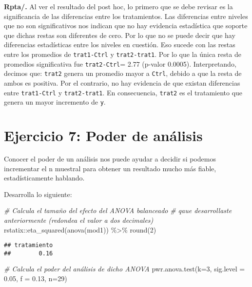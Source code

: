 \documentclass[
]{article}
\newenvironment{Shaded}{}{}
\newcommand{\AttributeTok}[1]{\textcolor[rgb]{0.49,0.56,0.16}{#1}}
\newcommand{\CommentTok}[1]{\textcolor[rgb]{0.38,0.63,0.69}{\textit{#1}}}
\newcommand{\DecValTok}[1]{\textcolor[rgb]{0.25,0.63,0.44}{#1}}
\newcommand{\FloatTok}[1]{\textcolor[rgb]{0.25,0.63,0.44}{#1}}
\newcommand{\FunctionTok}[1]{\textcolor[rgb]{0.02,0.16,0.49}{#1}}
\newcommand{\NormalTok}[1]{#1}
\newcommand{\SpecialCharTok}[1]{\textcolor[rgb]{0.25,0.44,0.63}{#1}}
\begin{document}
\textbf{Rpta/.} Al ver el resultado del post hoc, lo primero que se debe
revisar es la significancia de las diferencias entre los tratamientos.
Las diferencias entre niveles que no son significativos nos indican que
no hay evidencia estadística que soporte que dichas restas son
diferentes de cero. Por lo que no se puede decir que hay diferencias
estadísticas entre los niveles en cuestión. Eso sucede con las restas
entre los promedios de \texttt{trat1-Ctrl} y \texttt{trat2-trat1}. Por
lo que la única resta de promedios significativa fue
\texttt{trat2-Ctrl}= 2.77 (p-valor 0.0005). Interpretando, decimos que:
\texttt{trat2} genera un promedio mayor a \texttt{Ctrl}, debido a que la
resta de ambos es positiva. Por el contrario, no hay evidencia de que
existan diferencias entre \texttt{trat1-Ctrl} y \texttt{trat2-trat1}. En
consecuencia, \texttt{trat2} es el tratamiento que genera un mayor
incremento de \texttt{y}.

\hypertarget{ejercicio-7-poder-de-anuxe1lisis}{%
\section{\texorpdfstring{\textbf{Ejercicio 7: Poder de
análisis}}{Ejercicio 7: Poder de análisis}}\label{ejercicio-7-poder-de-anuxe1lisis}}

Conocer el poder de un análisis nos puede ayudar a decidir si podemos
incrementar el n muestral para obtener un resultado mucho más fiable,
estadísticamente hablando.

Desarrolla lo siguiente:

\begin{Shaded}
\begin{Highlighting}[]
\CommentTok{\# Calcula el tamaño del efecto del ANOVA balanceado}
\CommentTok{\# qaue desarrollaste anteriormente (redondea el valor a dos decimales)}
\NormalTok{rstatix}\SpecialCharTok{::}\FunctionTok{eta\_squared}\NormalTok{(}\FunctionTok{anova}\NormalTok{(mod1)) }\SpecialCharTok{\%\textgreater{}\%} \FunctionTok{round}\NormalTok{(}\DecValTok{2}\NormalTok{)}
\end{Highlighting}
\end{Shaded}

\begin{verbatim}
## tratamiento 
##        0.16
\end{verbatim}

\begin{Shaded}
\begin{Highlighting}[]
\CommentTok{\# Calcula el poder del análisis de dicho ANOVA}
\FunctionTok{pwr.anova.test}\NormalTok{(}\AttributeTok{k=}\DecValTok{3}\NormalTok{, }\AttributeTok{sig.level =} \FloatTok{0.05}\NormalTok{, }\AttributeTok{f =} \FloatTok{0.13}\NormalTok{, }\AttributeTok{n=}\DecValTok{29}\NormalTok{)}
\end{Highlighting}
\end{Shaded}
\end{document}
